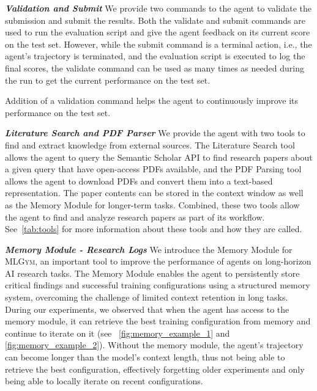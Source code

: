 \documentclass[]{fairmeta}
\newcommand{\ibold}[1]{\textbf{\textit{#1}}}
\newcommand{\dm}[1]{\colorbox{Emerald}{\textcolor{white}{Despoina}}\textcolor{Emerald}{\textbf{:#1}}}
\newcommand{\mlgym}{\fontfamily{lmr}\selectfont\mdseries\textsc{MLGym}\xspace}
\begin{document}
\ibold{Validation and Submit}
We provide two commands to the agent to validate the submission and submit the results.
%
Both the validate and submit commands are used to run the evaluation script and give the agent feedback on its current score on the test set.
%
However, while the submit command is a terminal action, i.e., the agent's trajectory is terminated, and the evaluation script is executed to log the final scores, the validate command can be used as many times as needed during the run to get the current performance on the test set.

Addition of a validation command helps the agent to continuously improve its performance on the test set.

\ibold{Literature Search and PDF Parser}
We provide the agent with two tools to find and extract knowledge from external sources. The Literature Search tool allows the agent to query the Semantic Scholar API to find research papers about a given query that have open-access PDFs available, and the PDF Parsing tool allows the agent to download PDFs and convert them into a text-based representation. The paper contents can be stored in the context window as well as the Memory Module for longer-term tasks. Combined, these two tools allow the agent to find and analyze research papers as part of its workflow. See~\autoref{tab:tools} for more information about these tools and how they are called.
 

\ibold{Memory Module - Research Logs}
We introduce the Memory Module for \mlgym, an important tool to improve the performance of agents on long-horizon AI research tasks. The Memory Module enables the agent to persistently store critical findings and successful training configurations using a structured memory system, overcoming the challenge of limited context retention in long tasks. During our experiments, we observed that when the agent has access to the memory module, it can retrieve the best training configuration from memory and continue to iterate on it (see ~\autoref{fig:memory_example_1} and \autoref{fig:memory_example_2}). Without the memory module, the agent's trajectory can become longer than the model's context length, thus not being able to retrieve the best configuration, effectively forgetting older experiments and only being able to locally iterate on recent configurations.  
\end{document}
